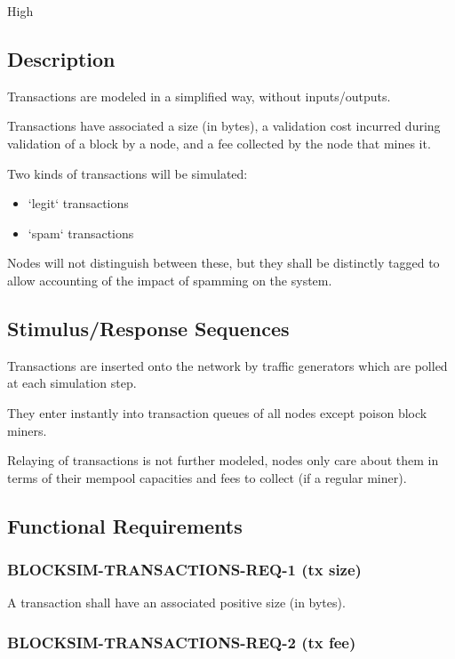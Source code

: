\documentclass{scrreprt}
\begin{document}
High

\subsection{Description}

Transactions are modeled in a simplified way, without inputs/outputs.

Transactions have associated a size (in bytes), a validation cost incurred
during validation of a block by a node, and a fee collected by the node that
mines it.

Two kinds of transactions will be simulated:

\begin{itemize}
   \item `legit` transactions
   \item `spam` transactions
\end{itemize}

Nodes will not distinguish between these, but they shall be distinctly
tagged to allow accounting of the impact of spamming on the system.


\subsection{Stimulus/Response Sequences}

Transactions are inserted onto the network by traffic generators which are
polled at each simulation step.

They enter instantly into transaction queues of all nodes except poison block
miners.

Relaying of transactions is not further modeled, nodes only care about
them in terms of their mempool capacities and fees to collect
(if a regular miner).


\subsection{Functional Requirements}

\subsubsection{BLOCKSIM-TRANSACTIONS-REQ-1 (tx size)}

A transaction shall have an associated positive size (in bytes).

\subsubsection{BLOCKSIM-TRANSACTIONS-REQ-2 (tx fee)}
\end{document}
